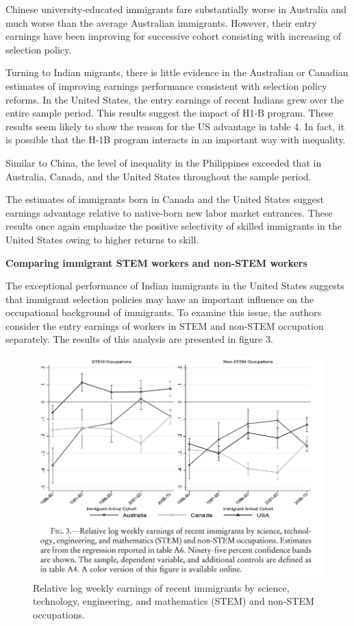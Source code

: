 \documentclass[../root]{subfiles}
\begin{document}
    Chinese university-educated immigrants fare substantially worse in Australia and much worse than the average Australian immigrants. However, their entry earnings have been improving for successive cohort consisting with increasing of selection policy. 
    
    
    Turning to Indian migrants, there is little evidence in the Australian or Canadian estimates of improving earnings performance consistent with selection policy reforms. In the United States, the entry earnings of recent Indians grew over the entire sample period.
    This results suggest the impact of H1-B program. These results seem likely to show the reason for the US advantage in table 4. In fact, it is possible that the H-1B program interacts in an important way with inequality.
    
    Similar to China, the level of inequality in the Philippines exceeded that in Australia, Canada, and the United States throughout the sample period.
    
    
    The estimates of immigrants born in Canada and the United States suggest earnings advantage relative to native-born new labor market entrances. These results once again emphasize the positive selectivity of skilled immigrants in the United States owing to higher returns to skill.
    
    {\bf Comparing immigrant STEM workers and non-STEM workers}
    
   The exceptional performance of Indian immigrants in the United States suggests that immigrant selection policies may have an important influence on the occupational background of immigrants. To examine this issue, the authors consider the entry earnings of workers in STEM and non-STEM occupation separately. The results of this analysis are presented in figure 3.
   
   \begin{figure}
        \centering
        \includegraphics[width = \linewidth]{0828sugiyama/FIgure_3.png}
        \caption{Relative log weekly earnings of recent immigrants by science, technology, engineering, and mathematics (STEM) and non-STEM occupations. }
        \label{fig:my_label}
    \end{figure}
    
\end{document}
